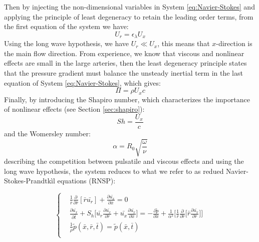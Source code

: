 \documentclass[12pt,a4paper]{article}
\numberwithin{equation}{section}
\begin{document}
Then by injecting the non-dimensional variables in System \ref{eq:Navier-Stokes} and applying the principle of least degeneracy to retain the leading order terms, from the first equation of the system we have:
\begin{equation}
U_r = \epsilon_\lambda U_x
\end{equation}
Using the long wave hypothesis, we have $U_r \ll U_x$, this means that $x$-direction is the main flow direction. From experience, we know that viscous and nonlinear effects are small in the large arteries, then the least degeneracy principle states that the pressure gradient must balance the unsteady inertial term in the last equation of System \ref{eq:Navier-Stokes}, which gives:
\begin{equation}
\Pi = \rho U_x c
\end{equation}
Finally, by introducing the Shapiro number, which characterizes the importance of nonlinear effects (see Section \ref{sec:shapiro}):
\begin{equation} \label{eq:shapiro}
Sh = \frac{U_x}{c}
\end{equation}
and the Womersley number:
\begin{equation}
\alpha = R_0 \sqrt{\frac{\omega}{\nu}}
\end{equation}
describing the competition between pulsatile and viscous effects and using the long wave hypothesis, the system reduces to what we refer to as redued Navier-Stokes-Prandtkìl equations (RNSP):
\begin{mdframed}[backgroundcolor=white!20] 
\begin{equation} \label{eq:RNSP}
  \left\{
      \begin{aligned}
       & \frac{1}{\bar{r}}\frac{\partial}{\partial \bar{r}}[\bar{r}\bar{u_r}]+\frac{\partial \bar{u_x}}{\partial \bar{x}} = 0\\
       & \frac{\partial \bar{u_x}}{\partial \bar{t}} + S_h\Bigg[\bar{u_r}\frac{\partial \bar{u_x}}{\partial \bar{r}} + \bar{u_x}\frac{\partial \bar{u_x}}{\partial\bar{x}}\Bigg] = -\frac{\partial \tilde{p}}{\partial\bar{x}} + \frac{1}{\alpha^2}\Bigg[\frac{1}{\bar{r}}\frac{\partial}{\partial \bar{r}}\Bigg[\bar{r}\frac{\partial \bar{u_x}}{\partial \bar{r}}\Bigg]\Bigg]  \\
       & \frac{1}{\rho}\tilde{p}(\bar{x}, \bar{r}, \bar{t}) = \tilde{p}(\bar{x}, \bar{t}) \\
      \end{aligned}
    \right.
\end{equation}
\end{mdframed}
\end{document}
